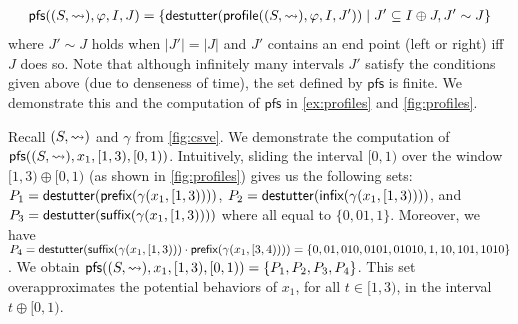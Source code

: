 \vspace{-1em}
\small
\begin{align*}
	\mathsf{pfs}((S,{\hb}), \varphi, I, J) = \{\destutter(\mathsf{profile}((S,{\hb}), \varphi, I, J')) \st J' \subseteq I \oplus J, J' \sim J\}
\end{align*}
\normalsize
where $J' \sim J$ holds when $|J'| = |J|$ and $J'$ contains an end point (left or right) iff $J$ does so.
Note that although infinitely many intervals $J'$ satisfy the conditions given above (due to denseness of time), the set defined by $\mathsf{pfs}$ is finite.
We demonstrate this and the computation of $\mathsf{pfs}$ in \cref{ex:profiles} and \cref{fig:profiles}.

\begin{example} \label{ex:profiles}
	Recall $(S, {\rightsquigarrow})$ and $\gamma$ from \cref{fig:csve}.
	We demonstrate the computation of $\mathsf{pfs}((S,{\rightsquigarrow}), x_1, [1,3), [0,1))$.
	Intuitively, sliding the interval $[0,1)$ over the window $[1,3) \oplus [0,1)$ (as shown in \cref{fig:profiles}) gives us the following sets:
	$P_1 = \mathsf{destutter}(\textsf{prefix}(\gamma(x_1, [1,3))))$,
	$P_2 = \mathsf{destutter}(\textsf{infix}(\gamma(x_1, [1,3))))$, and
	$P_3 = \mathsf{destutter}(\textsf{suffix}(\gamma(x_1, [1,3))))$  where all equal to $\{ 0, 01, 1 \}$.
	Moreover, we have $P_4 = \mathsf{destutter}(\textsf{suffix}(\gamma(x_1, [1,3))) \cdot \textsf{prefix}(\gamma(x_1, [3,4)))) = \{ 0, 01, 010, 0101, 01010, 1, 10, 101, 1010 \}$.
	We obtain $\mathsf{pfs}((S,{\rightsquigarrow}), x_1, [1,3), [0,1)) = \{P_1, P_2, P_3, P_4\}$.
	This set overapproximates the potential behaviors of $x_1$, for all $t \in [1,3)$, in the interval $t \oplus [0,1)$.
\end{example}



